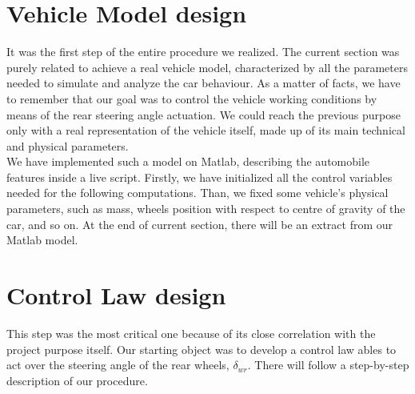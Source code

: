\documentclass[a4paper,12pt,titlepage]{report}
\begin{document}
\section{Vehicle Model design}
	It was the first step of the entire procedure we realized. The current section was purely related to achieve a real vehicle model, characterized by all the  parameters needed to simulate and analyze the car behaviour. As a matter of facts, we have to remember that our goal was to control the vehicle working conditions by means of the rear steering angle actuation. We could reach the previous purpose only with a real representation of the vehicle itself, made up of its main technical and physical parameters.\\
	We have implemented such a model on Matlab, describing the automobile features inside a live script. Firstly, we have initialized all the control variables needed for the following computations. Than, we fixed some vehicle's physical parameters, such as mass, wheels position with respect to centre of gravity of the car, and so on. At the end of current section, there will be an extract from our Matlab model.
		\begin{figure} %
			\centering
		\end{figure}
\section{Control Law design}
	This step was the most critical one because of its close correlation with the project purpose itself. Our starting object was to develop a control law ables to act over the steering angle of the rear wheels, $\delta_{wr}$. There will follow a step-by-step description of our procedure.
\end{document}

